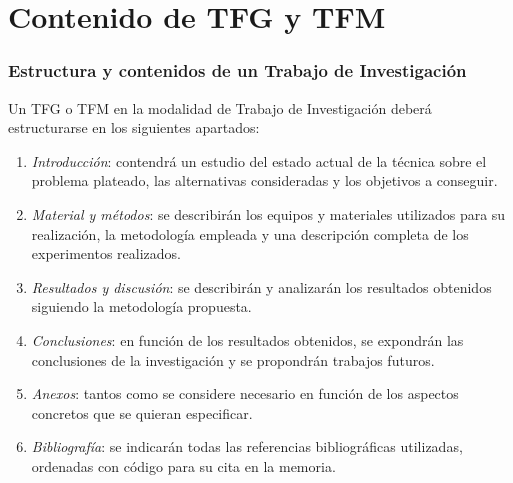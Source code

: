 
\section{Contenido de TFG y TFM} 

\subsubsection{Estructura y contenidos de un Trabajo de Investigación}
\label{sec:estructuratrabajoinvestigacion}

Un TFG o TFM en la modalidad de Trabajo de Investigación deberá estructurarse en los siguientes apartados:
\begin{enumerate}
    \item \textit{Introducción}: contendrá un estudio del estado actual de la técnica sobre el problema plateado, las alternativas consideradas y los objetivos a conseguir.
    \item \textit{Material y métodos}: se describirán los equipos y materiales utilizados para su realización, la metodología empleada y una descripción completa de los experimentos realizados.
    \item \textit{Resultados y discusión}: se describirán y analizarán los resultados obtenidos siguiendo la metodología propuesta.
    \item \textit{Conclusiones}: en función de los resultados obtenidos, 
    se expondrán las conclusiones de la investigación y se propondrán trabajos futuros.
    \item \textit{Anexos}: tantos como se considere necesario en función de los aspectos concretos que se quieran especificar.
    \item \textit{Bibliografía}: se indicarán todas las referencias bibliográficas utilizadas, ordenadas con código para su cita en la memoria.
\end{enumerate}